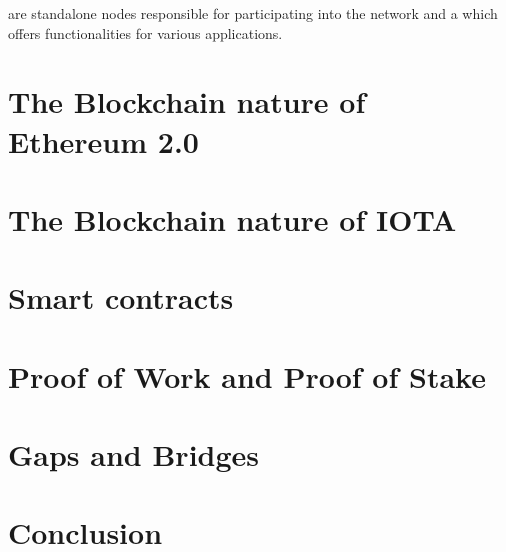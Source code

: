 \documentclass[a4paper,12pt,twoside]{book}
\begin{document}
are standalone nodes responsible for participating into the network and a  which offers  functionalities for various applications.

\section{The Blockchain nature of Ethereum 2.0}
\label{sec:EthereumNature}

\section{The Blockchain nature of IOTA}
\label{sec:IOTABlockchainNature}

\section{Smart contracts}
\label{sec:SmartContracts}

\section{Proof of Work and Proof of Stake}
\label{sec:PoWandPoS}

\section{Gaps and Bridges}
\label{sec:GapsBridges}

\section{Conclusion}
\label{sec:Conclusion}


\end{document}

